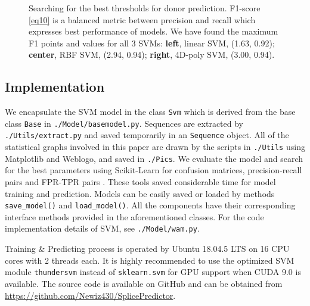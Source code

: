 \documentclass[journal,twoside]{IEEEtran}
\begin{document}
\begin{figure}[htbp]
\caption{Searching for the best thresholds for donor prediction. F1-score \eqref{eq10} is a balanced metric between  precision and recall which expresses best performance of models. We have found the maximum F1 points and values for all 3 SVMs: \textbf{left}, linear SVM, (1.63, 0.92); \textbf{center}, RBF SVM, (2.94, 0.94); \textbf{right}, 4D-poly SVM, (3.00, 0.94). }
\label{fig4}
\end{figure}

\subsection{Implementation}\label{3.3}

We encapsulate the SVM model in the class \texttt{Svm} which is derived from the base class \texttt{Base} in \texttt{./Model/basemodel.py}. Sequences are extracted by \texttt{./Utils/extract.py} and saved temporarily in an \texttt{Sequence} object. All of the statistical graphs involved in this paper are drawn by the scripts in \texttt{./Utils} using Matplotlib \cite{Hunter:2007} and Weblogo, and saved in \texttt{./Pics}. We evaluate the model and search for the best parameters using Scikit-Learn for confusion matrices, precision-recall pairs and FPR-TPR pairs \cite{pedregosa2011scikit}. These tools saved considerable time for model training and prediction. Models can be easily saved or loaded by methods \texttt{save\_model()} and \texttt{load\_model()}. All the components have their corresponding interface methods provided in the aforementioned classes. For the code implementation details of SVM, see \texttt{./Model/wam.py}. 

Training \& Predicting process is operated by Ubuntu 18.04.5 LTS on 16 CPU cores with 2 threads each. It is highly recommended to use the optimized SVM module \texttt{thundersvm} instead of \texttt{sklearn.svm} for GPU support when CUDA 9.0 is available. The source code is available on GitHub and can be obtained from \url{https://github.com/Newiz430/SplicePredictor}. 
\end{document}
